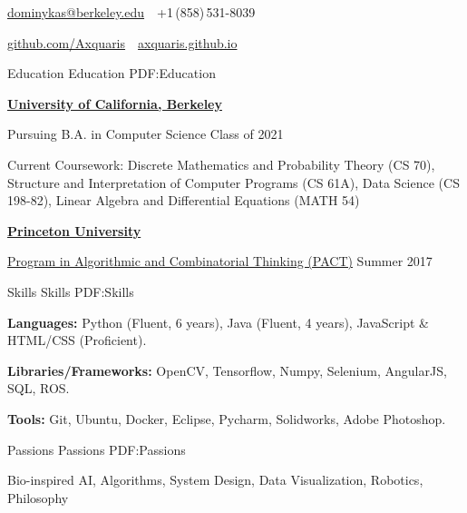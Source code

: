 \documentclass[letterpaper,MMMyyyy,nonstopmode]{simpleresumecv}
\newcommand{\CVAuthor}{Domas Buracas}
\newcommand{\CVWebpage}{http://axquaris.github.io/}
\begin{document}

\Title{\CVAuthor}

\begin{SubTitle}
\par
\href{mailto:dominykas@berkeley.edu}
{dominykas@berkeley.edu}
\,\SubBulletSymbol\,
+1\,(858)\,531-8039

\href{https://github.com/Axquaris}
{\url{github.com/Axquaris}}
\,\SubBulletSymbol\,
\href{\CVWebpage}
{\url{axquaris.github.io}}
\end{SubTitle}

\begin{Body}


\Section
{Education}
{Education}
{PDF:Education}

\Entry
\href{http://www.berkeley.edu/}
{\textbf{University of California, Berkeley}}

\Gap
\BulletItem
Pursuing B.A. in Computer Science
\hfill
Class of 2021
\begin{Detail}
\SubBulletItem
Current Coursework: Discrete Mathematics and Probability Theory (CS 70),
Structure and Interpretation of Computer Programs (CS 61A),
Data Science (CS 198-82), Linear Algebra and Differential Equations (MATH 54)
\end{Detail}

\BigGap
\Entry
\href{https://www.princeton.edu/}
{\textbf{Princeton University}}

\Gap
\BulletItem
\href{https://algorithmicthinking.org/}
{Program in Algorithmic and Combinatorial Thinking (PACT)}
\hfill
Summer 2017


\Section
{Skills}
{Skills}
{PDF:Skills}

\Entry
\textbf{Languages:}
Python (Fluent, 6 years),
Java (Fluent, 4 years),
JavaScript \& HTML/CSS (Proficient).

\Gap
\Entry
\textbf{Libraries/Frameworks:}
OpenCV,
Tensorflow,
Numpy,
Selenium,
AngularJS,
SQL,
ROS.

\Gap
\Entry
\textbf{Tools:}
Git,
Ubuntu,
Docker,
Eclipse,
Pycharm,
Solidworks,
Adobe Photoshop.



\Section
{Passions}
{Passions}
{PDF:Passions}

\Entry
Bio-inspired AI, Algorithms, System Design, Data Visualization, Robotics, Philosophy


\end{Body}
\end{document}
